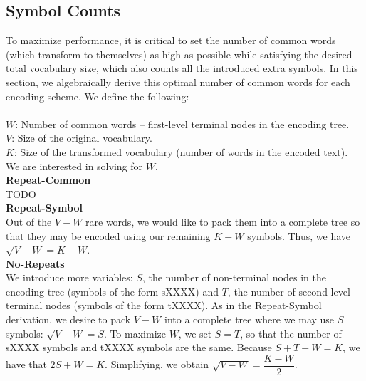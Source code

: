 \subsection{Symbol Counts}
To maximize performance, it is critical to set the number of common words (which
transform to themselves) as high as possible while satisfying the desired total vocabulary size,
which also counts all the introduced extra symbols. In this section, we algebraically derive
this optimal number of common words for each encoding scheme. We define the following:\\\\
$W$: Number of common words -- first-level terminal nodes in the encoding tree.\\
$V$: Size of the original vocabulary.\\
$K$: Size of the transformed vocabulary (number of words in the encoded text).\\

We are interested in solving for $W$.\\

\textbf{Repeat-Common}\\
TODO\\

\textbf{Repeat-Symbol}\\
Out of the $V - W$ rare words, we would like to pack them into a complete tree so that
they may be encoded using our remaining $K - W$ symbols. Thus, we have $\sqrt{V - W} = K - W$.\\

\textbf{No-Repeats}\\
We introduce more variables: $S$, the number of non-terminal nodes in the encoding tree (symbols
of the form sXXXX) and $T$, the number of second-level terminal nodes (symbols of the form tXXXX).
As in the Repeat-Symbol derivation, we desire to pack $V - W$ into a complete tree where we
may use $S$ symbols: $\sqrt{V - W} = S$. To maximize $W$, we set $S = T$, so that the number of sXXXX symbols and tXXXX
symbols are the same. Because $S + T + W = K$, we have that $2S + W = K$. Simplifying, we obtain
$\sqrt{V - W} = \dfrac{K - W}{2}$.